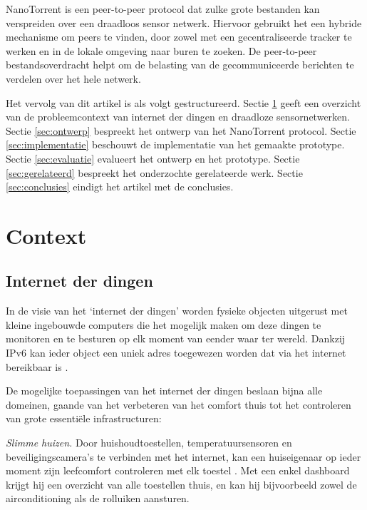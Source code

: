 \documentclass[journal]{IEEEtran}
\begin{document}
NanoTorrent is een peer-to-peer protocol dat zulke grote bestanden kan verspreiden over een draadloos sensor netwerk. Hiervoor gebruikt het een hybride mechanisme om peers te vinden, door zowel met een gecentraliseerde tracker te werken en in de lokale omgeving naar buren te zoeken. De peer-to-peer bestandsoverdracht helpt om de belasting van de gecommuniceerde berichten te verdelen over het hele netwerk.

Het vervolg van dit artikel is als volgt gestructureerd. Sectie \ref{sec:context} geeft een overzicht van de probleemcontext van internet der dingen en draadloze sensornetwerken. Sectie \ref{sec:ontwerp} bespreekt het ontwerp van het NanoTorrent protocol. Sectie \ref{sec:implementatie} beschouwt de implementatie van het gemaakte prototype. Sectie \ref{sec:evaluatie} evalueert het ontwerp en het prototype. Sectie \ref{sec:gerelateerd} bespreekt het onderzochte gerelateerde werk. Sectie \ref{sec:conclusies} eindigt het artikel met de conclusies.

\section{Context}
\label{sec:context}

\subsection{Internet der dingen}
In de visie van het `internet der dingen' worden fysieke objecten uitgerust met kleine ingebouwde computers die het mogelijk maken om deze dingen te monitoren en te besturen op elk moment van eender waar ter wereld. Dankzij IPv6 kan ieder object een uniek adres toegewezen worden dat via het internet bereikbaar is \cite{iotcluster15}.

De mogelijke toepassingen van het internet der dingen beslaan bijna alle domeinen, gaande van het verbeteren van het comfort thuis tot het controleren van grote essenti\"ele infrastructuren:

\emph{Slimme huizen.} Door huishoudtoestellen, temperatuursensoren en beveiligingscamera's te verbinden met het internet, kan een huiseigenaar op ieder moment zijn leefcomfort controleren met elk toestel \cite{chan-smart-home-review}. Met een enkel dashboard krijgt hij een overzicht van alle toestellen thuis, en kan hij bijvoorbeeld zowel de airconditioning als de rolluiken aansturen.
\end{document}
